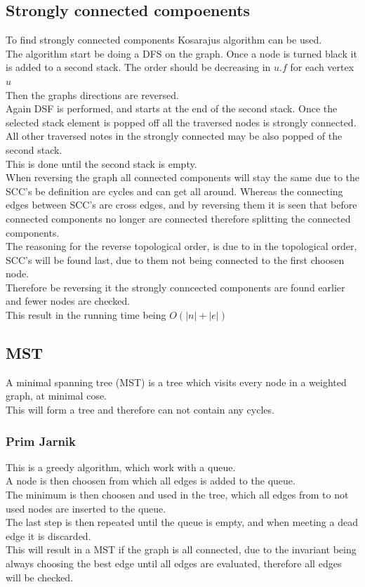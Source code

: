 \documentclass[12pt, a4paper]{article}
\begin{document}
		\subsection{Strongly connected compoenents}
			To find strongly connected components Kosarajus algorithm can be used.\\
			The algorithm start be doing a DFS on the graph. Once a node is turned black it is added to a second stack. The order should be decreasing in $u.f$ for each vertex $u$\\
			Then the graphs directions are reversed.\\
			Again DSF is performed, and starts at the end of the second stack. Once the selected stack element is popped off all the traversed nodes is strongly connected.\\
			All other traversed notes in the strongly connected may be also popped of the second stack.\\
			This is done until the second stack is empty.\\
			When reversing the graph all connected components will stay the same due to the SCC's be definition are cycles and can get all around. Whereas the connecting edges between SCC's are cross edges, and by reversing them it is seen that before connected components no longer are connected therefore splitting the connected components.\\
			The reasoning for the reverse topological order, is due to in the topological order, SCC's will be found last, due to them not being connected to the first choosen node.\\
			Therefore be reversing it the strongly conncected components are found earlier and fewer nodes are checked.\\
			This result in the running time being $O(|n|+|e|)$
		\subsection{MST}
			A minimal spanning tree (MST) is a tree which visits every node in a weighted graph, at minimal cose.\\
			This will form a tree and therefore can not contain any cycles.\\
			\subsubsection{Prim Jarnik}
				This is a greedy algorithm, which work with a queue.\\
				A node is then choosen from which all edges is added to the queue.\\
				The minimum is then choosen and used in the tree, which all edges from to not used nodes are inserted to the queue.\\
				The last step is then repeated until the queue is empty, and when meeting a dead edge it is discarded.\\
				This will result in a MST if the graph is all connected, due to the invariant being always choosing the best edge until all edges are evaluated, therefore all edges will be checked.
\end{document}
